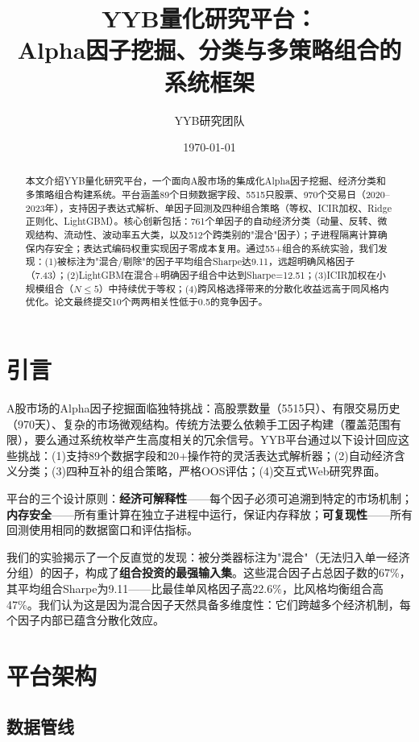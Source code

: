 \documentclass[11pt,a4paper]{ctexart}
\title{\textbf{YYB量化研究平台：\\Alpha因子挖掘、分类与多策略组合的系统框架}}
\author{YYB研究团队}
\date{\today}
\begin{document}
\maketitle

\begin{abstract}
本文介绍YYB量化研究平台，一个面向A股市场的集成化Alpha因子挖掘、经济分类和多策略组合构建系统。平台涵盖89个日频数据字段、5515只股票、970个交易日（2020--2023年），支持因子表达式解析、单因子回测及四种组合策略（等权、ICIR加权、Ridge正则化、LightGBM）。核心创新包括：761个单因子的自动经济分类（动量、反转、微观结构、流动性、波动率五大类，以及512个跨类别的"混合"因子）；子进程隔离计算确保内存安全；表达式编码权重实现因子零成本复用。通过55+组合的系统实验，我们发现：(1)被标注为"混合/剔除"的因子平均组合Sharpe达9.11，远超明确风格因子（7.43）；(2)LightGBM在混合+明确因子组合中达到Sharpe=12.51；(3)ICIR加权在小规模组合（$N\leq5$）中持续优于等权；(4)跨风格选择带来的分散化收益远高于同风格内优化。论文最终提交10个两两相关性低于0.5的竞争因子。
\end{abstract}

\section{引言}

A股市场的Alpha因子挖掘面临独特挑战：高股票数量（5515只）、有限交易历史（970天）、复杂的市场微观结构。传统方法要么依赖手工因子构建（覆盖范围有限），要么通过系统枚举产生高度相关的冗余信号。YYB平台通过以下设计回应这些挑战：(1)支持89个数据字段和20+操作符的灵活表达式解析器；(2)自动经济含义分类；(3)四种互补的组合策略，严格OOS评估；(4)交互式Web研究界面。

平台的三个设计原则：\textbf{经济可解释性}——每个因子必须可追溯到特定的市场机制；\textbf{内存安全}——所有重计算在独立子进程中运行，保证内存释放；\textbf{可复现性}——所有回测使用相同的数据窗口和评估指标。

我们的实验揭示了一个反直觉的发现：被分类器标注为"混合"（无法归入单一经济分组）的因子，构成了\textbf{组合投资的最强输入集}。这些混合因子占总因子数的67\%，其平均组合Sharpe为9.11——比最佳单风格因子高22.6\%，比风格均衡组合高47\%。我们认为这是因为混合因子天然具备多维度性：它们跨越多个经济机制，每个因子内部已蕴含分散化效应。

\section{平台架构}

\subsection{数据管线}
\end{document}
